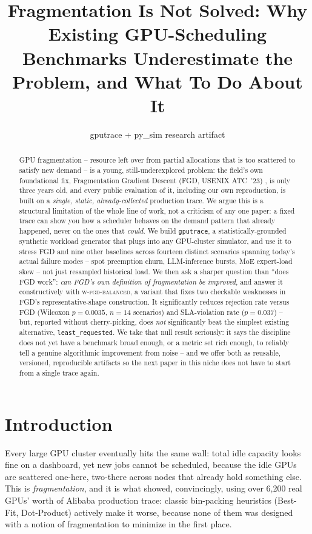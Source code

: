 \documentclass[11pt]{article}
\title{\textbf{Fragmentation Is Not Solved: Why Existing GPU-Scheduling\\
Benchmarks Underestimate the Problem, and What To Do About It}}
\author{gputrace + py\_sim research artifact}
\date{}
\begin{document}
\maketitle

\begin{abstract}
GPU fragmentation -- resource left over from partial allocations that is
too scattered to satisfy new demand -- is a young, still-underexplored
problem: the field's own foundational fix, Fragmentation Gradient Descent
(FGD, USENIX ATC~'23) \citep{fgd2023}, is only three years old, and every
public evaluation of it, including our own reproduction, is built on a
\emph{single, static, already-collected} production trace. We argue this
is a structural limitation of the whole line of work, not a criticism of
any one paper: a fixed trace can show you how a scheduler behaves on the
demand pattern that already happened, never on the ones that
\emph{could}. We build \texttt{gputrace}, a statistically-grounded
synthetic workload generator that plugs into any GPU-cluster simulator,
and use it to stress FGD and nine other baselines across fourteen
distinct scenarios spanning today's actual failure modes -- spot
preemption churn, LLM-inference bursts, MoE expert-load skew -- not just
resampled historical load. We then ask a sharper question than ``does
FGD work'': \emph{can FGD's own definition of fragmentation be improved},
and answer it constructively with \textsc{w-fgd-balanced}, a variant that
fixes two checkable weaknesses in FGD's representative-shape construction.
It significantly reduces rejection rate versus FGD (Wilcoxon $p=0.0035$,
$n=14$ scenarios) and SLA-violation rate ($p=0.037$) -- but, reported
without cherry-picking, does \emph{not} significantly beat the simplest
existing alternative, \texttt{least\_requested}. We take that null result
seriously: it says the discipline does not yet have a benchmark broad
enough, or a metric set rich enough, to reliably tell a genuine algorithmic
improvement from noise -- and we offer both as reusable, versioned,
reproducible artifacts so the next paper in this niche does not have to
start from a single trace again.
\end{abstract}

\tableofcontents
\newpage

\section{Introduction}
Every large GPU cluster eventually hits the same wall: total idle capacity
looks fine on a dashboard, yet new jobs cannot be scheduled, because the
idle GPUs are scattered one-here, two-there across nodes that already hold
something else. This is \emph{fragmentation}, and it is what
\citet{fgd2023} showed, convincingly, using over 6,200 real GPUs' worth of
Alibaba production trace: classic bin-packing heuristics (Best-Fit,
Dot-Product) actively make it worse, because none of them was designed
with a notion of fragmentation to minimize in the first place.
\end{document}
